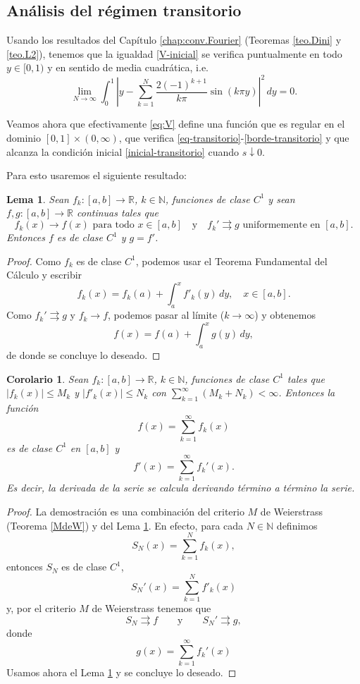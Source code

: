 \documentclass[12pt, a4paper]{amsbook}
\newcommand{\R}{{\mathbb R}}
\newcommand{\N}{{\mathbb N}}
\newtheorem{lema}[teo]{Lema}
\newtheorem{cor}[teo]{Corolario}
\theoremstyle{remark}
\theoremstyle{definition}
\numberwithin{section}{chapter}
\numberwithin{subsection}{section}
\numberwithin{equation}{section}
\numberwithin{figure}{chapter}
\begin{document}
\subsection*{Análisis del régimen transitorio}
Usando los resultados del Capítulo \ref{chap:conv.Fourier} (Teoremas \ref{teo.Dini} y \ref{teo.L2}), tenemos que la igualdad \eqref{V-inicial} se verifica puntualmente en todo $y\in [0, 1)$ y en sentido de media cuadrática, i.e.
$$
\lim_{N\to\infty} \int_0^1 \left|y-\sum_{k=1}^N \frac{2(-1)^{k+1}}{k\pi} \sin(k\pi y)\right|^2\, dy = 0.
$$

Veamos ahora que efectivamente \eqref{eq:V} define una función que es regular en el dominio $[0,1]\times(0, \infty)$, que verifica \eqref{eq-transitorio}-\eqref{borde-transitorio} y que alcanza la condición inicial \eqref{inicial-transitorio} cuando $s\downarrow 0$.

Para esto usaremos el siguiente resultado:
\begin{lema}\label{conv.f'}
Sean $f_k\colon [a, b]\to\R$, $k\in\N$, funciones de clase $C^1$ y sean $f, g\colon [a, b]\to\R$ continuas tales que
$$
f_k(x)\to f(x) \text{ para todo }x\in[a,b] \quad \text{y}\quad f_k'\rightrightarrows g \text{ uniformemente en } [a, b].
$$
Entonces $f$ es de clase $C^1$ y $g=f'$.
\end{lema}

\begin{proof}
Como $f_k$ es de clase $C^1$, podemos usar el Teorema Fundamental del Cálculo y escribir
$$
f_k(x) = f_k(a) + \int_a^x f'_k(y)\, dy,\quad x\in [a, b].
$$
Como $f_k'\rightrightarrows g$ y $f_k\to f$, podemos pasar al límite ($k\to\infty$) y obtenemos
$$
f(x) = f(a) + \int_a^x g(y)\, dy,
$$
de donde se concluye lo deseado.
\end{proof}

\begin{cor}\label{coro-reg}
Sean $f_k\colon[a, b]\to \R$, $k\in\N$, funciones de clase $C^1$ tales que $|f_k(x)|\le M_k$ y $|f'_k(x)|\le N_k$ con $\sum_{k=1}^\infty (M_k + N_k) < \infty$. Entonces la función
$$
f(x) = \sum_{k=1}^\infty f_k(x)
$$
es de clase $C^1$ en $[a, b]$ y 
$$
f'(x) = \sum_{k=1}^\infty f_k'(x).
$$
Es decir, la derivada de la serie se calcula derivando término a término la serie.
\end{cor}

\begin{proof}
La demostración es una combinación del criterio $M$ de Weierstrass (Teorema \ref{MdeW}) y del Lema \ref{conv.f'}. En efecto, para cada $N\in\N$ definimos
$$
S_N(x) = \sum_{k=1}^N f_k(x),
$$
entonces $S_N$ es de clase $C^1$,
$$
S_N'(x) = \sum_{k=1}^N f'_k(x)
$$
y, por el criterio $M$ de Weierstrass tenemos que
$$
S_N\rightrightarrows f\qquad \text{y}\qquad S_N'\rightrightarrows g,
$$
donde
$$
g(x) = \sum_{k=1}^\infty f_k'(x)
$$
Usamos ahora el Lema \ref{conv.f'} y se concluye lo deseado.
\end{proof}
\end{document}
